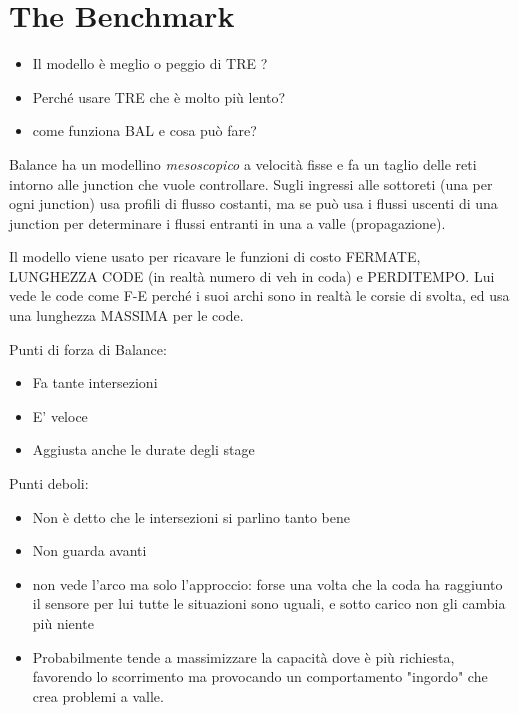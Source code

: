 \chapter{The Benchmark}

\begin{itemize}
\item Il modello è meglio o peggio di TRE ?
\item Perché usare TRE che è molto più lento?
\item come funziona BAL e cosa può fare?
\end{itemize}

Balance ha un modellino \emph{mesoscopico} a velocità fisse e fa un taglio delle reti intorno alle junction che vuole controllare. Sugli ingressi alle sottoreti (una per ogni junction) usa profili di flusso costanti, ma se può usa i flussi uscenti di una junction per determinare i flussi entranti in una a valle (propagazione).

Il modello viene usato per ricavare le funzioni di costo FERMATE, LUNGHEZZA CODE (in realtà numero di veh in coda) e PERDITEMPO.
Lui vede le code come F-E perché i suoi archi sono in realtà le corsie di svolta, ed usa una lunghezza MASSIMA per le code.

Punti di forza di Balance:
\begin{itemize}
\item Fa tante intersezioni
\item E' veloce
\item Aggiusta anche le durate degli stage
\end{itemize}

Punti deboli:
\begin{itemize}
\item Non è detto che le intersezioni si parlino tanto bene
\item Non guarda avanti
\item non vede l'arco ma solo l'approccio: forse una volta che la coda ha raggiunto il sensore per lui tutte le situazioni sono uguali, e sotto carico non gli cambia più niente
\item Probabilmente tende a massimizzare la capacità dove è più richiesta, favorendo lo scorrimento ma provocando un comportamento "ingordo" che crea problemi a valle.
\end{itemize}

